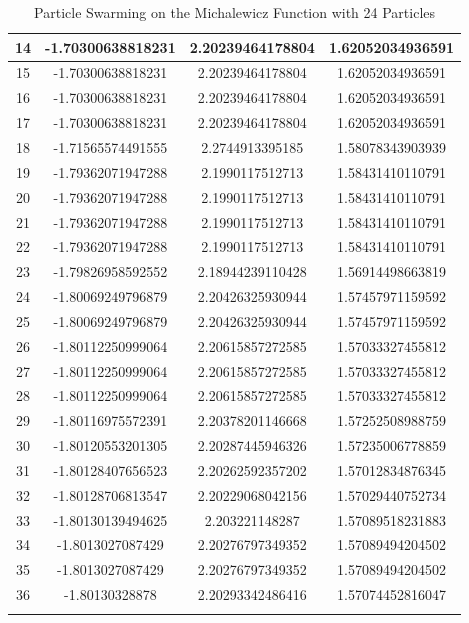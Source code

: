 \documentclass[oneside,12pt,openany]{book}
\begin{document}
\begin{longtable}[c]{|c|c|c|c|}
        14 & -1.70300638818231 & 2.20239464178804 & 1.62052034936591 \\ \hline
        15 & -1.70300638818231 & 2.20239464178804 & 1.62052034936591 \\ \hline
        16 & -1.70300638818231 & 2.20239464178804 & 1.62052034936591 \\ \hline
        17 & -1.70300638818231 & 2.20239464178804 & 1.62052034936591 \\ \hline
        18 & -1.71565574491555 & 2.2744913395185 & 1.58078343903939 \\ \hline
        19 & -1.79362071947288 & 2.1990117512713 & 1.58431410110791 \\ \hline
        20 & -1.79362071947288 & 2.1990117512713 & 1.58431410110791 \\ \hline
        21 & -1.79362071947288 & 2.1990117512713 & 1.58431410110791 \\ \hline
        22 & -1.79362071947288 & 2.1990117512713 & 1.58431410110791 \\ \hline
        23 & -1.79826958592552 & 2.18944239110428 & 1.56914498663819 \\ \hline
        24 & -1.80069249796879 & 2.20426325930944 & 1.57457971159592 \\ \hline
        25 & -1.80069249796879 & 2.20426325930944 & 1.57457971159592 \\ \hline
        26 & -1.80112250999064 & 2.20615857272585 & 1.57033327455812 \\ \hline
        27 & -1.80112250999064 & 2.20615857272585 & 1.57033327455812 \\ \hline
        28 & -1.80112250999064 & 2.20615857272585 & 1.57033327455812 \\ \hline
        29 & -1.80116975572391 & 2.20378201146668 & 1.57252508988759 \\ \hline
        30 & -1.80120553201305 & 2.20287445946326 & 1.57235006778859 \\ \hline
        31 & -1.80128407656523 & 2.20262592357202 & 1.57012834876345 \\ \hline
        32 & -1.80128706813547 & 2.20229068042156 & 1.57029440752734 \\ \hline
        33 & -1.80130139494625 & 2.203221148287 & 1.57089518231883 \\ \hline
        34 & -1.8013027087429 & 2.20276797349352 & 1.57089494204502 \\ \hline
        35 & -1.8013027087429 & 2.20276797349352 & 1.57089494204502 \\ \hline
        36 & -1.80130328878 & 2.20293342486416 & 1.57074452816047 \\ \hline
        \caption{Particle Swarming on the Michalewicz Function with 24 Particles}
        \label{tab:swarmMichal} \\
    \end{longtable}
\end{document}
